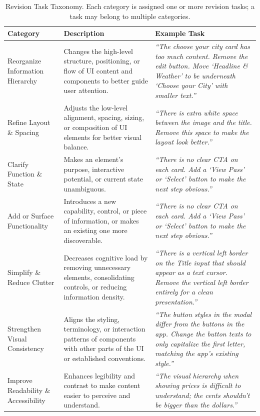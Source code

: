 \documentclass[sigconf,nonacm]{acmart}
\begin{document}
\begin{table}[t]
\centering
\caption{Revision Task Taxonomy. Each category is assigned one or more revision tasks; a task may belong to multiple categories.}
\label{tab:taxonomy}
\begin{tabular}{p{3.8cm} p{7cm} p{5.5cm}}
\toprule
\textbf{Category} & \textbf{Description} & \textbf{Example Task} \\
\midrule
Reorganize Information Hierarchy
  & Changes the high-level structure, positioning, or flow of UI content and components to better guide user attention.
  & \textit{``The choose your city card has too much content. Remove the edit button. Move `Headline \& Weather' to be underneath `Choose your City' with smaller text.''} \\
\addlinespace
Refine Layout \& Spacing
  & Adjusts the low-level alignment, spacing, sizing, or composition of UI elements for better visual balance.
  & \textit{``There is extra white space between the image and the title. Remove this space to make the layout look better.''} \\
\addlinespace
Clarify Function \& State
  & Makes an element's purpose, interactive potential, or current state unambiguous.
  & \textit{``There is no clear CTA on each card. Add a `View Pass' or `Select' button to make the next step obvious.''} \\
\addlinespace
Add or Surface Functionality
  & Introduces a new capability, control, or piece of information, or makes an existing one more discoverable.
  & \textit{``There is no clear CTA on each card. Add a `View Pass' or `Select' button to make the next step obvious.''} \\
\addlinespace
Simplify \& Reduce Clutter
  & Decreases cognitive load by removing unnecessary elements, consolidating controls, or reducing information density.
  & \textit{``There is a vertical left border on the Title input that should appear as a text cursor. Remove the vertical left border entirely for a clean presentation.''} \\
\addlinespace
Strengthen Visual Consistency
  & Aligns the styling, terminology, or interaction patterns of components with other parts of the UI or established conventions.
  & \textit{``The button styles in the modal differ from the buttons in the app. Change the button texts to only capitalize the first letter, matching the app's existing style.''} \\
\addlinespace
Improve Readability \& Accessibility
  & Enhances legibility and contrast to make content easier to perceive and understand.
  & \textit{``The visual hierarchy when showing prices is difficult to understand; the cents shouldn't be bigger than the dollars.''} \\
\bottomrule
\end{tabular}
\end{table}
\end{document}
